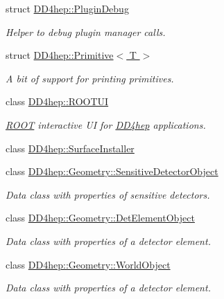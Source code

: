 \begin{DoxyCompactItemize}
struct \hyperlink{struct_d_d4hep_1_1_plugin_debug}{DD4hep::PluginDebug}
\begin{DoxyCompactList}\small\item\em Helper to debug plugin manager calls. \item\end{DoxyCompactList}\item 
struct \hyperlink{struct_d_d4hep_1_1_primitive}{DD4hep::Primitive$<$ T $>$}
\begin{DoxyCompactList}\small\item\em A bit of support for printing primitives. \item\end{DoxyCompactList}\item 
class \hyperlink{class_d_d4hep_1_1_r_o_o_t_u_i}{DD4hep::ROOTUI}
\begin{DoxyCompactList}\small\item\em \hyperlink{namespace_r_o_o_t}{ROOT} interactive UI for \hyperlink{namespace_d_d4hep}{DD4hep} applications. \item\end{DoxyCompactList}\item 
class \hyperlink{class_d_d4hep_1_1_surface_installer}{DD4hep::SurfaceInstaller}
\item 
class \hyperlink{class_d_d4hep_1_1_geometry_1_1_sensitive_detector_object}{DD4hep::Geometry::SensitiveDetectorObject}
\begin{DoxyCompactList}\small\item\em Data class with properties of sensitive detectors. \item\end{DoxyCompactList}\item 
class \hyperlink{class_d_d4hep_1_1_geometry_1_1_det_element_object}{DD4hep::Geometry::DetElementObject}
\begin{DoxyCompactList}\small\item\em Data class with properties of a detector element. \item\end{DoxyCompactList}\item 
class \hyperlink{class_d_d4hep_1_1_geometry_1_1_world_object}{DD4hep::Geometry::WorldObject}
\begin{DoxyCompactList}\small\item\em Data class with properties of a detector element. \item\end{DoxyCompactList}\item 

\end{DoxyCompactItemize}
